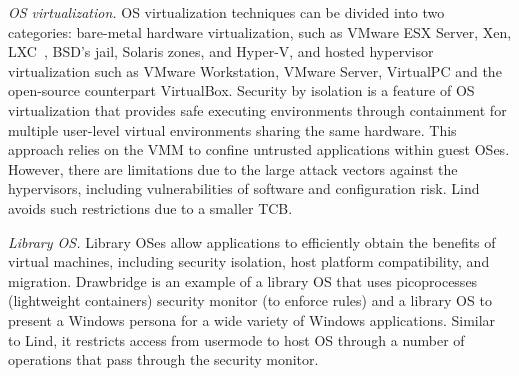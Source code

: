 
\textit{OS virtualization.}
OS virtualization techniques can be divided into two categories:
bare-metal hardware virtualization, such as VMware ESX Server, Xen,
LXC~\cite{LXC}, BSD's jail, Solaris zones, and Hyper-V, and
hosted hypervisor virtualization such as VMware
Workstation, VMware Server, VirtualPC and the open-source counterpart
VirtualBox.
%
Security by isolation \cite{Qubes, Overshadow, SecureVM, HypSec} is a feature of OS virtualization that
provides safe executing environments through containment for multiple
user-level virtual environments sharing the same hardware. This
approach relies on the VMM to confine untrusted applications within
guest OSes. However, there are limitations due to
the large attack vectors against the hypervisors, including
vulnerabilities of software and configuration risk. Lind avoids such restrictions due to a smaller TCB.

\textit{Library OS.}
Library OSes allow applications to efficiently
obtain the benefits of virtual machines,
including security isolation, host platform compatibility, and
migration. 
%
Drawbridge \cite{Drawbridge-11} is an example of a library OS that uses picoprocesses
 (lightweight containers) security monitor (to enforce rules)
and a library OS to present a Windows persona for a wide variety of
Windows applications. Similar to Lind,
it restricts access from usermode to host OS through a number
of operations that pass through the security monitor.

